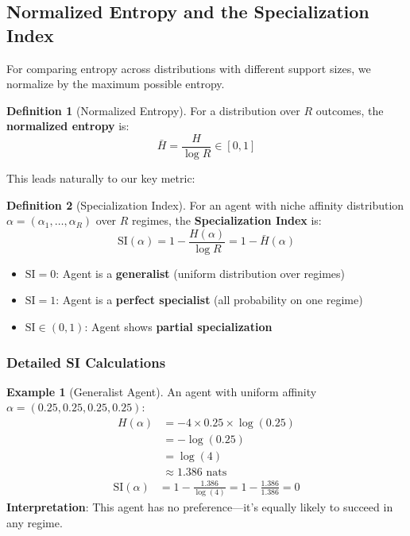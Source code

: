 \documentclass[11pt,a4paper]{article}
\theoremstyle{definition}
\newtheorem{definition}{Definition}[section]
\newtheorem{example}{Example}[section]
\theoremstyle{plain}
\newcommand{\SI}{\text{SI}}
\begin{document}
\subsection{Normalized Entropy and the Specialization Index}

For comparing entropy across distributions with different support sizes, we normalize by the maximum possible entropy.

\begin{definition}[Normalized Entropy]
For a distribution over $R$ outcomes, the \textbf{normalized entropy} is:
\begin{equation}
\bar{H} = \frac{H}{\log R} \in [0, 1]
\end{equation}
\end{definition}

This leads naturally to our key metric:

\begin{definition}[Specialization Index]
For an agent with niche affinity distribution $\alpha = (\alpha_1, \ldots, \alpha_R)$ over $R$ regimes, the \textbf{Specialization Index} is:
\begin{equation}
\SI(\alpha) = 1 - \frac{H(\alpha)}{\log R} = 1 - \bar{H}(\alpha)
\end{equation}
\end{definition}

\begin{keypoint}
\begin{itemize}
    \item $\SI = 0$: Agent is a \textbf{generalist} (uniform distribution over regimes)
    \item $\SI = 1$: Agent is a \textbf{perfect specialist} (all probability on one regime)
    \item $\SI \in (0, 1)$: Agent shows \textbf{partial specialization}
\end{itemize}
\end{keypoint}

\subsubsection{Detailed SI Calculations}

\begin{example}[Generalist Agent]
An agent with uniform affinity $\alpha = (0.25, 0.25, 0.25, 0.25)$:
\begin{align}
H(\alpha) &= -4 \times 0.25 \times \log(0.25) \\
&= -\log(0.25) \\
&= \log(4) \\
&\approx 1.386 \text{ nats}
\end{align}
\begin{align}
\SI(\alpha) &= 1 - \frac{1.386}{\log(4)} = 1 - \frac{1.386}{1.386} = 0
\end{align}
\textbf{Interpretation}: This agent has no preference---it's equally likely to succeed in any regime.
\end{example}
\end{document}
